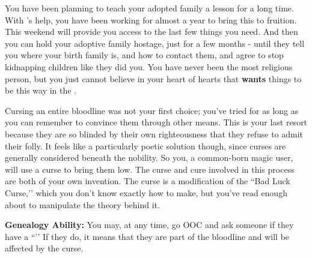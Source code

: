 \documentclass[green]{GL2020}
\begin{document}
\name{\gPunishKidnappers{}}

You have been planning to teach your adopted family a lesson for a long time. With \cLibAssist{\full}’s help, you have been working for almost a year to bring this to fruition. This weekend will provide you access to the last few things you need. And then you can hold your adoptive family hostage, just for a few months - until they tell you where your birth family is, and how to contact them, and agree to stop kidnapping children like they did you. You have never been the most religious person, but you just cannot believe in your heart of hearts that \cFarmGod{} \textbf{wants} things to be this way in the \pFarm{}.

Cursing an entire bloodline was not your first choice; you’ve tried for as long as you can remember to convince them through other means. This is your last resort because they are so blinded by their own righteousness that they refuse to admit their folly. It feels like a particularly poetic solution though, since curses are generally considered beneath the nobility. So you, a common-born magic user, will use a curse to bring them low. The curse and cure involved in this process are both of your own invention. The curse is a modification of the ``Bad Luck Curse,’’ which you don’t know exactly how to make, but you’ve read enough about to manipulate the theory behind it.

\textbf{Genealogy Ability:} You may, at any time, go OOC and ask someone if they have a ``\mCPacket{\MYname}’’ If they do, it means that they are part of the \cAdopted{\formal} bloodline and will be affected by the curse.
\end{document}
